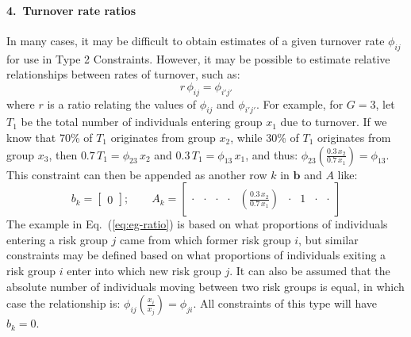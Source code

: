 \paragraph{4.~Turnover rate ratios}
\label{con:rel-turnover}
In many cases, it may be difficult to
obtain estimates of a given turnover rate $\phi_{ij}$
for use in Type 2 Constraints.
However, it may be possible to estimate
relative relationships between rates of turnover,
such as:
\begin{equation}\label{eq:ratio}
r\,\phi_{ij} = \phi_{i'j'}
\end{equation}
where $r$ is a ratio relating the values of $\phi_{ij}$ and $\phi_{i'j'}$.
For example, for $G = 3$,
let $T_1$ be the total number of individuals entering group $x_1$ due to turnover.
If we know that
70\% of $T_1$ originates from group $x_2$, while
30\% of $T_1$ originates from group $x_3$,
then $0.7\,T_1 = \phi_{23} \, x_2$ and $0.3\,T_1 = \phi_{13} \, x_1$,
and thus: $\phi_{23} \left(\frac{0.3\,x_2}{0.7\,x_1}\right) = \phi_{13}$.
This constraint can then be appended as another row $k$ in $\bm{b}$ and $A$ like:
\begin{equation}\label{eq:eg-ratio}
b_k = \left[\begin{array}{c}
0
\end{array}\right];\qquad
A_k = \left[\begin{array}{ccccccccc}
	\cdot & \cdot & \cdot & \cdot & \left(\frac{0.3\,x_2}{0.7\,x_1}\right) & \cdot & 1 & \cdot & \cdot
\end{array}\right] 
\end{equation}
The example in Eq.~(\ref{eq:eg-ratio}) is based on
what proportions of individuals entering a risk group $j$
came from which former risk group $i$,
but similar constraints may be defined based on
what proportions of individuals exiting a risk group $i$
enter into which new risk group $j$.
It can also be assumed that
the absolute number of individuals moving between two risk groups is equal,
in which case the relationship is:
$\phi_{ij} \left(\frac{x_i}{x_j}\right) = \phi_{ji}$.
All constraints of this type will have $b_k = 0$.
